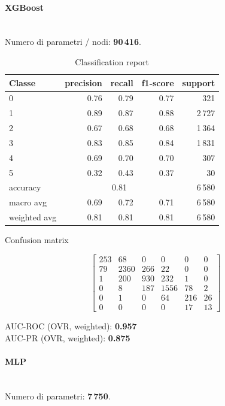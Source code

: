 \documentclass[a4paper,12pt]{report}
\begin{document}
	
	\paragraph{XGBoost} \mbox{}\\
	Numero di parametri / nodi: \textbf{90\,416}.
	
	\begin{table}[H]
		\centering
		\caption{Classification report}
		\label{tab:cr_xgb}
		\begin{tabular}{lrrrr}
			\toprule
			Classe & precision & recall & f1-score & support \\
			\midrule
			0 & 0.76 & 0.79 & 0.77 & 321 \\
			1 & 0.89 & 0.87 & 0.88 & 2\,727 \\
			2 & 0.67 & 0.68 & 0.68 & 1\,364 \\
			3 & 0.83 & 0.85 & 0.84 & 1\,831 \\
			4 & 0.69 & 0.70 & 0.70 & 307 \\
			5 & 0.32 & 0.43 & 0.37 & 30 \\
			\midrule
			accuracy & \multicolumn{3}{c}{0.81} & 6\,580 \\
			macro avg & 0.69 & 0.72 & 0.71 & 6\,580 \\
			weighted avg & 0.81 & 0.81 & 0.81 & 6\,580 \\
			\bottomrule
		\end{tabular}
	\end{table}
	
	\begin{table}[H]
		\centering
		\caption{Confusion matrix}
		\label{tab:cm_xgb}
		\[
		\begin{bmatrix}
			253 & 68  & 0   & 0   & 0   & 0   \\
			79  & 2360& 266 & 22  & 0   & 0   \\
			1   & 200 & 930 & 232 & 1   & 0   \\
			0   & 8   & 187 & 1556& 78  & 2   \\
			0   & 1   & 0   & 64  & 216 & 26  \\
			0   & 0   & 0   & 0   & 17  & 13
		\end{bmatrix}
		\]
		\vspace{1mm}
		
		AUC-ROC (OVR, weighted): \textbf{0.957} \\
		AUC-PR  (OVR, weighted): \textbf{0.875}
	\end{table}
	
	
	\paragraph{MLP} \mbox{}\\
	Numero di parametri: \textbf{7\,750}.
	
\end{document}

